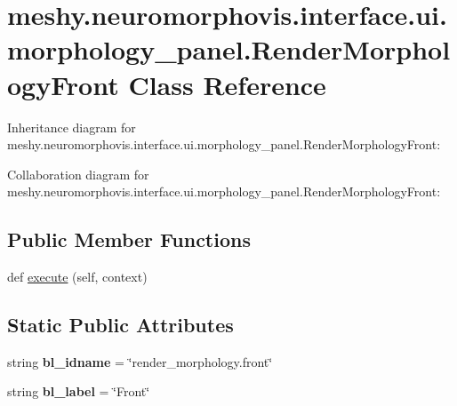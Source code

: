 \hypertarget{classmeshy_1_1neuromorphovis_1_1interface_1_1ui_1_1morphology__panel_1_1RenderMorphologyFront}{}\section{meshy.\+neuromorphovis.\+interface.\+ui.\+morphology\+\_\+panel.\+Render\+Morphology\+Front Class Reference}
\label{classmeshy_1_1neuromorphovis_1_1interface_1_1ui_1_1morphology__panel_1_1RenderMorphologyFront}


Inheritance diagram for meshy.\+neuromorphovis.\+interface.\+ui.\+morphology\+\_\+panel.\+Render\+Morphology\+Front\+:


Collaboration diagram for meshy.\+neuromorphovis.\+interface.\+ui.\+morphology\+\_\+panel.\+Render\+Morphology\+Front\+:
\subsection*{Public Member Functions}
\begin{DoxyCompactItemize}
\item 
def \hyperlink{classmeshy_1_1neuromorphovis_1_1interface_1_1ui_1_1morphology__panel_1_1RenderMorphologyFront_a0d922a676b29c290c52d20f229c58647}{execute} (self, context)
\end{DoxyCompactItemize}
\subsection*{Static Public Attributes}
\begin{DoxyCompactItemize}
\item 
string {\bfseries bl\+\_\+idname} = \char`\"{}render\+\_\+morphology.\+front\char`\"{}\hypertarget{classmeshy_1_1neuromorphovis_1_1interface_1_1ui_1_1morphology__panel_1_1RenderMorphologyFront_addc45fae74132e00c156749fe9e0dce4}{}\label{classmeshy_1_1neuromorphovis_1_1interface_1_1ui_1_1morphology__panel_1_1RenderMorphologyFront_addc45fae74132e00c156749fe9e0dce4}

\item 
string {\bfseries bl\+\_\+label} = \char`\"{}Front\char`\"{}\hypertarget{classmeshy_1_1neuromorphovis_1_1interface_1_1ui_1_1morphology__panel_1_1RenderMorphologyFront_a3feaf6673ebdc776d1a7e74699c57f5b}{}\label{classmeshy_1_1neuromorphovis_1_1interface_1_1ui_1_1morphology__panel_1_1RenderMorphologyFront_a3feaf6673ebdc776d1a7e74699c57f5b}

\end{DoxyCompactItemize}


